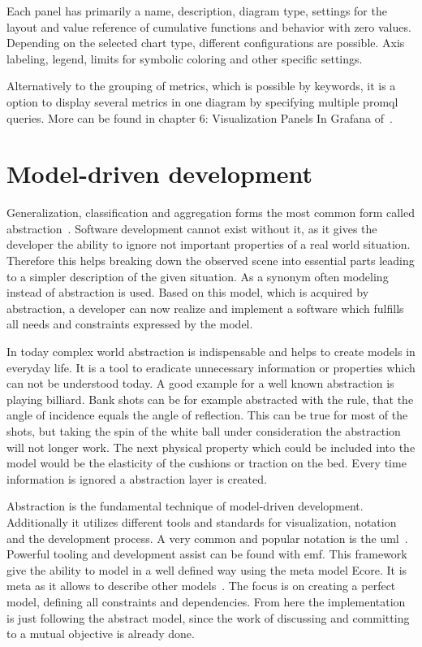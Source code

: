 Each panel has primarily a name, description, diagram type, settings for the layout and value reference of cumulative functions and behavior with zero values. Depending on the selected chart type, different configurations are possible. Axis labeling, legend, limits for symbolic coloring and other specific settings.

Alternatively to the grouping of metrics, which is possible by keywords, it is a option to display several metrics in one diagram by specifying multiple \gls{promql} queries. More can be found in chapter 6: Visualization Panels In Grafana of~\cite{Salituro2020}.

\section{Model-driven development}

Generalization, classification and aggregation forms the most common form called abstraction~\cite{Brambilla_2017}. Software development cannot exist without it, as it gives the developer the ability to ignore not important properties of a real world situation. Therefore this helps breaking down the observed scene into essential parts leading to a simpler description of the given situation. As a synonym often modeling instead of abstraction is used. Based on this model, which is acquired by abstraction, a developer can now realize and implement a software which fulfills all needs and constraints expressed by the model. 

In today complex world abstraction is indispensable and helps to create models in everyday life. It is a tool to eradicate unnecessary information or properties which can not be understood today. A good example for a well known abstraction is playing billiard. Bank shots can be for example abstracted with the rule, that the angle of incidence equals the angle of reflection. This can be true for most of the shots, but taking the spin of the white ball under consideration the abstraction will not longer work. The next physical property which could be included into the model would be the elasticity of the cushions or traction on the bed. Every time information is ignored a abstraction layer is created.

Abstraction is the fundamental technique of model-driven development. Additionally it utilizes different tools and standards for visualization, notation and the development process. A very common and popular notation is the \gls{uml}~\cite{Cook2017}. Powerful tooling and development assist can be found with \gls{emf}. This framework give the ability to model in a well defined way using the meta model Ecore. It is meta as it allows to describe other models~\cite[section 2.3.1]{steinberg2008emf}. The focus is on creating a perfect model, defining all constraints and dependencies. From here the implementation is just following the abstract model, since the work of discussing and committing to a mutual objective is already done.

